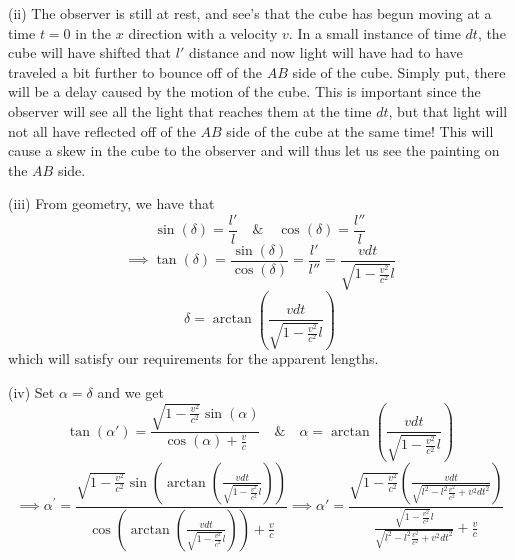\documentclass[10pt]{article}
\begin{document}
(ii) The observer is still at rest, and see's that the cube has begun moving at a time $t=0$ in the $x$ direction with a velocity $v$. In a small instance of time $dt$, the cube will have shifted that $l'$ distance and now light will have had to have traveled a bit further to bounce off of the $AB$ side of the cube. Simply put, there will be a delay caused by the motion of the cube. This is important since the observer will see all the light that reaches them at the time $dt$, but that light will not all have reflected off of the $AB$ side of the cube at the same time! This will cause a skew in the cube to the observer and will thus let us see the painting on the $AB$ side.

(iii) From geometry, we have that
\[ \sin(\delta) = \frac{l'}{l} \quad \& \quad \cos(\delta) = \frac{l''}{l}\]
\[ \implies \tan(\delta) = \frac{\sin(\delta)}{\cos(\delta)} = \frac{l'}{l''} = \frac{vdt}{\sqrt{1-\frac{v^{2}}{c^{2}}}l} \]
\[ \delta = \arctan\left(\frac{vdt}{\sqrt{1-\frac{v^{2}}{c^{2}}}l}\right) \]
which will satisfy our requirements for the apparent lengths.

(iv) Set $\alpha = \delta$ and we get
\[ \tan(\alpha') = \frac{\sqrt{1- \frac{v^{2}}{c^{2}}}\sin(\alpha)}{\cos(\alpha) + \frac{v}{c}} \quad \& \quad\alpha = \arctan\left(\frac{vdt}{\sqrt{1-\frac{v^{2}}{c^{2}}}l}\right)\]
\[ \implies \alpha^{\prime} =\frac{\sqrt{1- \frac{v^{2}}{c^{2}}}\sin\left(\arctan\left(\frac{vdt}{\sqrt{1-\frac{v^{2}}{c^{2}}}l}\right)\right)}{\cos\left(\arctan\left(\frac{vdt}{\sqrt{1-\frac{v^{2}}{c^{2}}}l}\right)\right) + \frac{v}{c}} \implies \alpha' = \frac{\sqrt{1-\frac{v^{2}}{c^{2}}}\left(\frac{vdt}{\sqrt{l^{2}-l^{2}\frac{v^{2}}{c^{2}} + v^{2}dt^{2}}}\right)}{\frac{\sqrt{1 - \frac{v^{2}}{c^{2}}}l}{\sqrt{l^{2}-l^{2}\frac{v^{2}}{c^{2}} + v^{2}dt^{2}}} + \frac{v}{c}} \]
\end{document}
